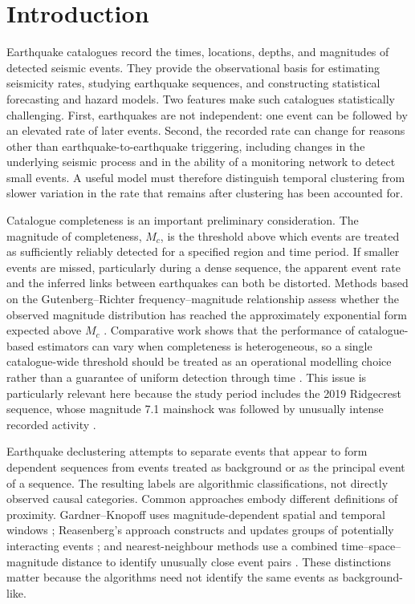 \section{Introduction}
\label{sec:introduction}

Earthquake catalogues record the times, locations, depths, and magnitudes of
detected seismic events. They provide the observational basis for estimating
seismicity rates, studying earthquake sequences, and constructing statistical
forecasting and hazard models. Two features make such catalogues statistically
challenging. First, earthquakes are not independent: one event can be followed
by an elevated rate of later events. Second, the recorded rate can change for
reasons other than earthquake-to-earthquake triggering, including changes in
the underlying seismic process and in the ability of a monitoring network to
detect small events. A useful model must therefore distinguish temporal
clustering from slower variation in the rate that remains after clustering has
been accounted for.

Catalogue completeness is an important preliminary consideration. The
magnitude of completeness, $M_c$, is the threshold above which events are
treated as sufficiently reliably detected for a specified region and time
period. If smaller events are missed, particularly during a dense sequence,
the apparent event rate and the inferred links between earthquakes can both be
distorted. Methods based on the Gutenberg--Richter frequency--magnitude
relationship assess whether the observed magnitude distribution has reached
the approximately exponential form expected above $M_c$
\citep{gutenberg1944frequency,wiemer2000minimum,woessner2005assessing}.
Comparative work shows that the performance of catalogue-based estimators can
vary when completeness is heterogeneous, so a single catalogue-wide threshold
should be treated as an operational modelling choice rather than a guarantee
of uniform detection through time \citep{wang2025magnitude}. This issue is
particularly relevant here because the study period includes the 2019
Ridgecrest sequence, whose magnitude 7.1 mainshock was followed by unusually
intense recorded activity \citep{ross2019hierarchical}.

Earthquake declustering attempts to separate events that appear to form
dependent sequences from events treated as background or as the principal
event of a sequence. The resulting labels are algorithmic classifications,
not directly observed causal categories. Common approaches embody different
definitions of proximity. Gardner--Knopoff uses magnitude-dependent spatial
and temporal windows \citep{gardner1974}; Reasenberg's approach constructs and
updates groups of potentially interacting events \citep{reasenberg1985}; and
nearest-neighbour methods use a combined time--space--magnitude distance to
identify unusually close event pairs \citep{zaliapin2013,zaliapin2020declustering}.
These distinctions matter because the algorithms need not identify the same
events as background-like.


